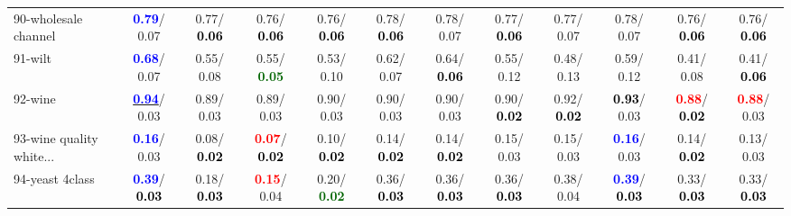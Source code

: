 \begin{table}[h]
\begin{center}
{\begin{tabular}{lc|c|c|c|c|c|c|c|c|c|c}
90-wholesale channel & \textcolor{blue}{\textbf{  0.79}}/  0.07 &   0.77/\textcolor{black}{\textbf{  0.06}} &   0.76/\textcolor{black}{\textbf{  0.06}} &   0.76/\textcolor{black}{\textbf{  0.06}} &   0.78/\textcolor{black}{\textbf{  0.06}} &   0.78/  0.07 &   0.77/\textcolor{black}{\textbf{  0.06}} &   0.77/  0.07 &   0.78/  0.07 &   0.76/\textcolor{black}{\textbf{  0.06}} &   0.76/\textcolor{black}{\textbf{  0.06}} \\
91-wilt & \textcolor{blue}{\textbf{  0.68}}/  0.07 &   0.55/  0.08 &   0.55/\textcolor{darkgreen}{\textbf{  0.05}} &   0.53/  0.10 &   0.62/  0.07 &   0.64/\textcolor{black}{\textbf{  0.06}} &   0.55/  0.12 &   0.48/  0.13 &   0.59/  0.12 &   0.41/  0.08 &   0.41/\textcolor{black}{\textbf{  0.06}} \\
92-wine & \underline{\textcolor{blue}{\textbf{  0.94}}}/  0.03 &   0.89/  0.03 &   0.89/  0.03 &   0.90/  0.03 &   0.90/  0.03 &   0.90/  0.03 &   0.90/\textcolor{black}{\textbf{  0.02}} &   0.92/\textcolor{black}{\textbf{  0.02}} & \textcolor{black}{\textbf{  0.93}}/  0.03 & \textcolor{red}{\textbf{  0.88}}/\textcolor{black}{\textbf{  0.02}} & \textcolor{red}{\textbf{  0.88}}/  0.03 \\ \hline
93-wine quality white... & \textcolor{blue}{\textbf{  0.16}}/  0.03 &   0.08/\textcolor{black}{\textbf{  0.02}} & \textcolor{red}{\textbf{  0.07}}/\textcolor{black}{\textbf{  0.02}} &   0.10/\textcolor{black}{\textbf{  0.02}} &   0.14/\textcolor{black}{\textbf{  0.02}} &   0.14/\textcolor{black}{\textbf{  0.02}} &   0.15/  0.03 &   0.15/  0.03 & \textcolor{blue}{\textbf{  0.16}}/  0.03 &   0.14/\textcolor{black}{\textbf{  0.02}} &   0.13/  0.03 \\
94-yeast 4class & \textcolor{blue}{\textbf{  0.39}}/\textcolor{black}{\textbf{  0.03}} &   0.18/\textcolor{black}{\textbf{  0.03}} & \textcolor{red}{\textbf{  0.15}}/  0.04 &   0.20/\textcolor{darkgreen}{\textbf{  0.02}} &   0.36/\textcolor{black}{\textbf{  0.03}} &   0.36/\textcolor{black}{\textbf{  0.03}} &   0.36/\textcolor{black}{\textbf{  0.03}} &   0.38/  0.04 & \textcolor{blue}{\textbf{  0.39}}/\textcolor{black}{\textbf{  0.03}} &   0.33/\textcolor{black}{\textbf{  0.03}} &   0.33/\textcolor{black}{\textbf{  0.03}} \\\end{tabular}
}\label{strats2bRFw}
\end{center}
\end{table}